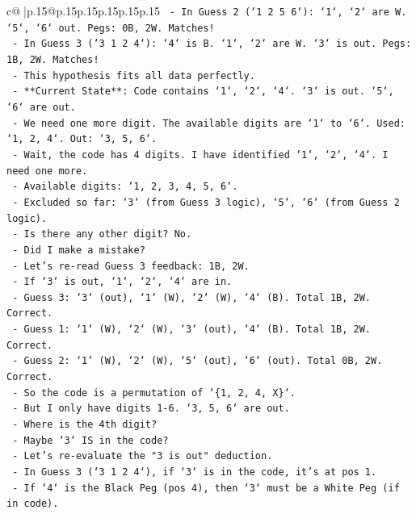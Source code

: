 \documentclass{article}
\begin{document}
{\begin{supertabular}{c@{$\;$}|p{.15\linewidth}@{}p{.15\linewidth}p{.15\linewidth}p{.15\linewidth}p{.15\linewidth}p{.15\linewidth}}
{{{\texttt{            {-} In Guess 2 (`1 2 5 6`): `1`, `2` are W. `5`, `6` out. Pegs: 0B, 2W. Matches!} \\
\texttt{            {-} In Guess 3 (`3 1 2 4`): `4` is B. `1`, `2` are W. `3` is out. Pegs: 1B, 2W. Matches!} \\
\texttt{            {-} This hypothesis fits all data perfectly.} \\
\texttt{            {-} **Current State**: Code contains `1`, `2`, `4`. `3` is out. `5`, `6` are out.} \\
\texttt{            {-} We need one more digit. The available digits are `1` to `6`. Used: `1, 2, 4`. Out: `3, 5, 6`.} \\
\texttt{            {-} Wait, the code has 4 digits. I have identified `1`, `2`, `4`. I need one more.} \\
\texttt{            {-} Available digits: `1, 2, 3, 4, 5, 6`.} \\
\texttt{            {-} Excluded so far: `3` (from Guess 3 logic), `5`, `6` (from Guess 2 logic).} \\
\texttt{            {-} Is there any other digit? No.} \\
\texttt{            {-} Did I make a mistake?} \\
\texttt{            {-} Let's re{-}read Guess 3 feedback: 1B, 2W.} \\
\texttt{            {-} If `3` is out, `1`, `2`, `4` are in.} \\
\texttt{            {-} Guess 3: `3` (out), `1` (W), `2` (W), `4` (B). Total 1B, 2W. Correct.} \\
\texttt{            {-} Guess 1: `1` (W), `2` (W), `3` (out), `4` (B). Total 1B, 2W. Correct.} \\
\texttt{            {-} Guess 2: `1` (W), `2` (W), `5` (out), `6` (out). Total 0B, 2W. Correct.} \\
\texttt{            {-} So the code is a permutation of `\{1, 2, 4, X\}`.} \\
\texttt{            {-} But I only have digits 1{-}6. `3, 5, 6` are out.} \\
\texttt{            {-} Where is the 4th digit?} \\
\texttt{            {-} Maybe `3` IS in the code?} \\
\texttt{            {-} Let's re{-}evaluate the "3 is out" deduction.} \\
\texttt{            {-} In Guess 3 (`3 1 2 4`), if `3` is in the code, it's at pos 1.} \\
\texttt{            {-} If `4` is the Black Peg (pos 4), then `3` must be a White Peg (if in code).} \\
}}}
\end{supertabular}}
\end{document}
